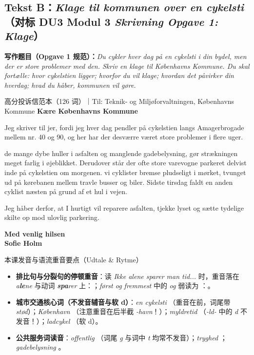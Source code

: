 \subsection*{Tekst B：\textit{Klage til kommunen over en cykelsti}（对标 DU3 Modul 3 \textit{Skrivning Opgave 1: Klage}）}

\textbf{写作题目（Opgave 1 规范）：}\textit{Du cykler hver dag på en cykelsti i din bydel, men der er store problemer med den. Skriv en klage til Københavns Kommune. Du skal fortælle:  hvor cykelstien ligger;  hvorfor du vil klage;  hvordan det påvirker din hverdag;  hvad du håber, kommunen vil gøre.}

\begin{emailbox}{高分投诉信范本（126 词）｜Til: Teknik- og Miljøforvaltningen, Københavns Kommune}
\textbf{Kære Københavns Kommune}

Jeg skriver til jer, fordi jeg hver dag pendler på cykelstien langs Amagerbrogade mellem nr. 40 og 90, og her har der desværre været store problemer i flere uger.

 de mange dybe huller i asfalten og manglende gadebelysning,  gør strækningen meget farlig i øjeblikket. Derudover står der ofte store varevogne parkeret delvist inde på cykelstien om morgenen.  vi cyklister bremse pludseligt i mørket,  tvunget ud på kørebanen mellem travle busser og biler. Sidste tirsdag faldt en anden cyklist næsten på grund af et hul i vejen.

Jeg håber derfor, at I hurtigt vil reparere asfalten, tjekke lyset og sætte tydelige skilte op mod ulovlig parkering.

\textbf{Med venlig hilsen}\\
\textbf{Sofie Holm}
\end{emailbox}

\begin{tipbox}{本课发音与语流重音要点（Udtale \& Rytme）}
\begin{itemize}
  \item \textbf{排比句与分裂句的停顿重音}：读 \textit{Ikke alene sparer man tid...} 时，重音落在 \textit{a\textbf{le}ne} 与动词 \textit{\textbf{spa}rer} 上：；\textit{først og fremmest} 中的 \textit{og} 弱读为 ：。
  \item \textbf{城市交通核心词（不发音辅音与软 d）}：\textit{en cykelsti} （重音在前，词尾带 \textit{stød}）；\textit{København} （注意重音在后半截 \textit{-havn}！）；\textit{myldretid} （\textit{-ld-} 中的 \textit{d} 不发音！）；\textit{ladcykel} （软 d）。
  \item \textbf{公共服务词读音}：\textit{offentlig} （词尾 \textit{g} 与词中 \textit{t} 均常不发音）；\textit{tryghed} ；\textit{gadebelysning} 。
\end{itemize}
\end{tipbox}

